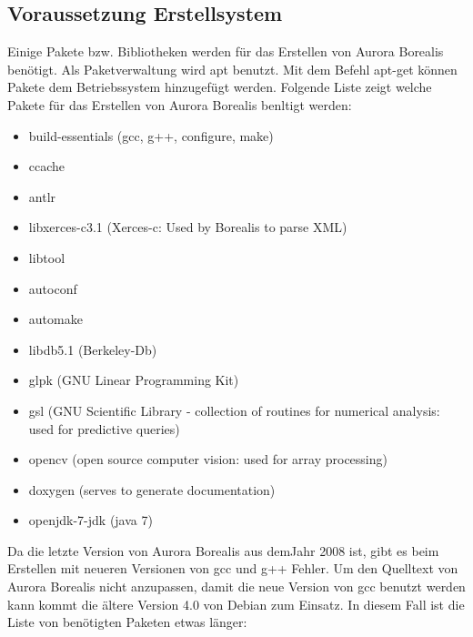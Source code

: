 \subsection{Voraussetzung Erstellsystem}

Einige Pakete bzw. Bibliotheken werden für das Erstellen von Aurora Borealis benötigt. Als Paketverwaltung wird apt benutzt. Mit dem Befehl apt-get können Pakete dem Betriebssystem hinzugefügt werden. Folgende Liste zeigt welche Pakete für das Erstellen von Aurora Borealis benltigt werden:

\begin{itemize}
	\item build-essentials (gcc, g++, configure, make)
	\item ccache
	\item antlr
	\item libxerces-c3.1 (Xerces-c: Used by Borealis to parse XML)
	\item libtool
	\item autoconf
	\item automake
	\item libdb5.1 (Berkeley-Db)
	\item glpk (GNU Linear Programming Kit)
	\item gsl (GNU Scientific Library - collection of routines for numerical analysis: used for predictive queries)
	\item opencv (open source computer vision: used for array processing)
	\item doxygen (serves to generate documentation)
	\item openjdk-7-jdk (java 7)
\end{itemize}

Da die letzte Version von Aurora Borealis aus demJahr 2008 ist, gibt es beim Erstellen mit neueren Versionen von gcc und g++ Fehler. Um den Quelltext von Aurora Borealis nicht anzupassen, damit die neue Version von gcc benutzt werden kann kommt die ältere Version 4.0 von Debian zum Einsatz. In diesem Fall ist die Liste von benötigten Paketen etwas länger:

